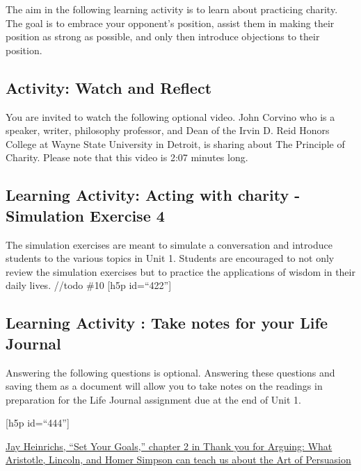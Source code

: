 \documentclass[
]{book}
\begin{document}
The aim in the following learning activity is to learn about practicing charity. The goal is to embrace your opponent's position, assist them in making their position as strong as possible, and only then introduce objections to their position.

\hypertarget{activity-watch-and-reflect-4}{%
\subsection*{Activity: Watch and Reflect}\label{activity-watch-and-reflect-4}}

\begin{reflect}
You are invited to watch the following optional video. John Corvino who is a speaker, writer, philosophy professor, and Dean of the Irvin D. Reid Honors College at Wayne State University in Detroit, is sharing about The Principle of Charity. Please note that this video is 2:07 minutes long.
\end{reflect}

\hypertarget{learning-activity-acting-with-charity---simulation-exercise-4}{%
\subsection{Learning Activity: Acting with charity - Simulation Exercise 4}\label{learning-activity-acting-with-charity---simulation-exercise-4}}

The simulation exercises are meant to simulate a conversation and introduce students to the various topics in Unit 1. Students are encouraged to not only review the simulation exercises but to practice the applications of wisdom in their daily lives.
//todo \#10
{[}h5p id=``422''{]}

\hypertarget{learning-activity-take-notes-for-your-life-journal-4}{%
\subsection{Learning Activity : Take notes for your Life Journal}\label{learning-activity-take-notes-for-your-life-journal-4}}

Answering the following questions is optional. Answering these questions and saving them as a document will allow you to take notes on the readings in preparation for the Life Journal assignment due at the end of Unit 1.

{[}h5p id=``444''{]}

\href{assets/u1/PAT-10018663_Thank_you_for.pdf}{Jay Heinrichs, ``Set Your Goals,'' chapter 2 in Thank you for Arguing: What Aristotle, Lincoln, and Homer Simpson can teach us about the Art of Persuasion}
\end{document}
